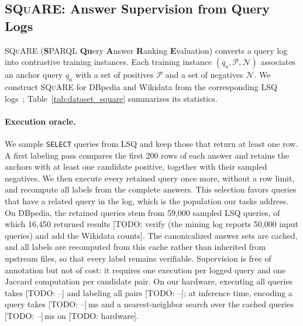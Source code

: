 \documentclass[runningheads]{llncs}
\newcommand{\squareds}{\textsc{SQuARE}}
\newcommand{\hp}[1]{{\color{red!75!black}#1}}
\begin{document}
\subsection{\squareds{}: Answer Supervision from Query Logs}
\label{sec:data}

\squareds{} (\textbf{S}PARQL \textbf{Qu}ery \textbf{A}nswer \textbf{R}anking
\textbf{E}valuation) converts a query log into contrastive training instances.
Each training instance $(q_a,\mathcal{P},\mathcal{N})$ associates an anchor query $q_a$
with a set of positives $\mathcal{P}$ and a set of negatives $\mathcal{N}$.
We construct \squareds{} for DBpedia and Wikidata from the corresponding LSQ
logs~\cite{saleem2015lsq}; Table~\ref{tab:dataset_square} summarizes its
statistics.

\paragraph{Execution oracle.}
We sample \texttt{SELECT} queries from LSQ and keep those that return at
least one row. A first labeling pass compares the first 200 rows of each
answer and retains the anchors with at least one candidate positive,
together with their sampled negatives. We then execute every retained query
once more, without a row limit, and recompute all labels from the complete
answers. This selection favors queries that have a related query in the
log, which is the population our tasks address. On DBpedia, the retained
queries stem from 59{,}000 sampled LSQ queries, of which 16{,}450 returned
results \hp{[TODO: verify (the mining log reports 50{,}000 input queries) and
add the Wikidata counts]}. The
canonicalized answer sets are cached, and all labels are recomputed from this
cache rather than inherited from upstream files, so that every label remains
verifiable. Supervision is free of annotation but not of cost: it requires one
execution per logged query and one Jaccard computation per candidate pair.
On our hardware, executing all queries takes \hp{[TODO: --]} and labeling
all pairs \hp{[TODO: --]}; at inference time, encoding a query takes \hp{[TODO: --]}\,ms and a
nearest-neighbor search over the cached queries \hp{[TODO: --]}\,ms on
\hp{[TODO: hardware]}.
\end{document}
